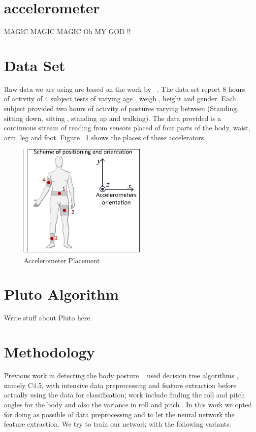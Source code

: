 \documentclass{article}
\begin{document}
\section{accelerometer}
\label{accelerometer} 
MAGIC MAGIC MAGIC Oh MY GOD !!

\section{Data Set}
\label{DataSet}

Raw data we are using are based on the work by ~\cite{ugulino2012wearable}. The data set report 8 hours of activity of 4 subject tests 
of varying age , weigh , height and gender. Each subject provided two hours of activity of postures varying between (Standing,
sitting down, sitting , standing up and walking). The data provided is a continuous stream of reading from sensors placed of four 
parts of the body, waist, arm, leg and foot. Figure ~\ref{acc_placement} shows the places of these accelerators.   


\begin{figure}[h]
\centering
\includegraphics[width=2.5in]{acc_placement}
\caption{Accelerometer Placement}
\label{acc_placement}
\end{figure} 
 

\section{Pluto Algorithm}
\label{Pluto}
Write stuff about Pluto here.

\section{Methodology}

Previous work in detecting the body posture ~\cite{ugulino2012wearable} used decision tree algorithms , namely C4.5,  with intensive 
data preprocessing and feature extraction before actually using the data for classification; work include finding the roll and 
pitch angles for the body and also the variance in roll and pitch . In this work we opted for doing as possible of data preprocessing
and to let the neural network the feature extraction. We try to train our network with the following variants:
\end{document}
